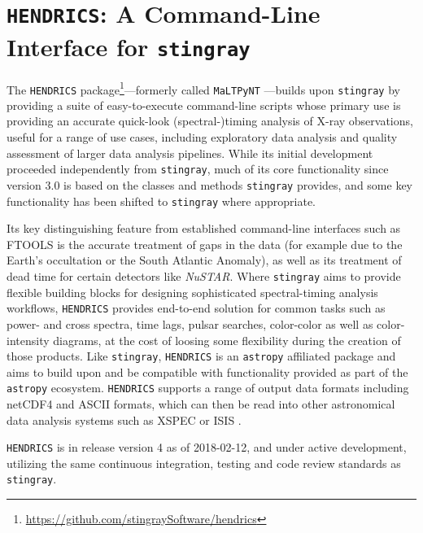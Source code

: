 \documentclass[twocolumn]{aastex62}
\newcommand{\project}[1]{\textsl{#1}\xspace}
\newcommand{\nustar}{\project{NuSTAR}\xspace}
\newcommand{\stingray}{\texttt{stingray}\xspace}
\newcommand{\astropy}{\texttt{astropy}\xspace}
\newcommand{\hendrics}{\texttt{HENDRICS}\xspace}
\begin{document}
\section{\hendrics: A Command-Line Interface for \stingray}
\label{sec:hendrics}

The \hendrics package\footnote{\url{https://github.com/stingraySoftware/hendrics}}---formerly called \texttt{MaLTPyNT} \citep{bachetti2015b}---builds upon \stingray by providing a suite of easy-to-execute command-line scripts whose primary use is providing an accurate quick-look (spectral-)timing analysis of X-ray observations, useful for a range of use cases, including exploratory data analysis and quality assessment of larger data analysis pipelines. 
While its initial development proceeded independently from \stingray, much of its core functionality since version 3.0 is based on the classes and methods \stingray provides, and some key functionality has been shifted to \stingray where appropriate. 

Its key distinguishing feature from established command-line interfaces such as FTOOLS is the accurate treatment of gaps in the data (for example due to the Earth's occultation or the South Atlantic Anomaly), as well as its treatment of dead time for certain detectors like \nustar. 
Where \stingray aims to provide flexible building blocks for designing sophisticated spectral-timing analysis workflows, \hendrics provides end-to-end solution for common tasks such as power- and cross spectra, time lags, pulsar searches, color-color as well as color-intensity diagrams, at the cost of loosing some flexibility during the creation of those products. 
Like \stingray, \hendrics is an \astropy affiliated package and aims to build upon and be compatible with functionality provided as part of the \astropy ecosystem.
\hendrics supports a range of output data formats including netCDF4 and ASCII formats, which can then be read into other astronomical data analysis systems such as XSPEC \citep{arnaud1996} or ISIS  \citep{houck2000}.

\hendrics is in release version 4 as of 2018-02-12, and under active development, utilizing the same continuous integration, testing and code review standards as \stingray.
\end{document}
